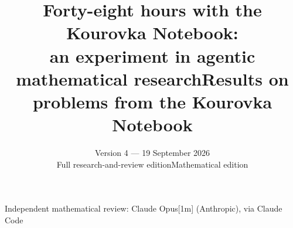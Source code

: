 \documentclass[11pt]{article}
\title{Forty-eight hours with the Kourovka Notebook:\\
an experiment in agentic mathematical research}
\title{Results on problems from the Kourovka Notebook}
\date{Version 4 --- 19 September 2026\\[3pt]
\small\iffullpaper Full research-and-review edition\else Mathematical edition\fi}
\begin{document}
\maketitle
\iffullpaper
\begin{center}\small
Independent mathematical review: Claude Opus[1m] (Anthropic), via Claude Code
\end{center}

\else

\fi
\setcounter{tocdepth}{1}
\tableofcontents
\iffullpaper

\else

\fi
\end{document}

